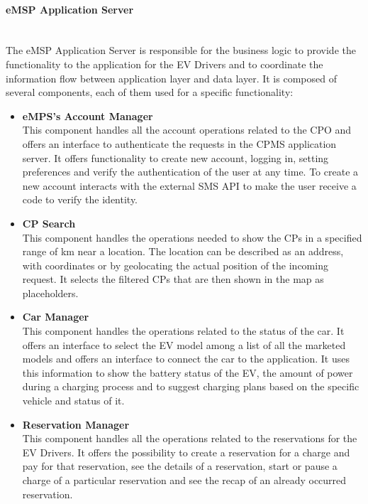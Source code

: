 \paragraph*{eMSP Application Server} \hfill \\
The eMSP Application Server is responsible for the business logic to provide the functionality to the application for the EV Drivers and to coordinate the information flow between application layer and data layer.
It is composed of several components, each of them used for a specific functionality:\\
\begin{itemize}
    \item \textbf{eMPS's Account Manager} \\ This component handles all the account operations related to the CPO and offers an interface to authenticate
          the requests in the CPMS application server.
          It offers functionality to create new account, logging in, setting preferences and verify the authentication of the user at any time.
          To create a new account interacts with the external SMS API to make the user receive a code to verify the identity.
    \item \textbf{CP Search} \\ This component handles the operations needed to show the CPs in a specified range of km near a location. The location
          can be described as an address, with coordinates or by geolocating the actual position of the incoming request. It selects the filtered CPs that are then
          shown in the map as placeholders.
    \item \textbf{Car Manager} \\ This component handles the operations related to the status of the car. It offers an interface to select the EV model among a list of
          all the marketed models and offers an interface to connect the car to the application. It uses this information to show the battery status of the EV, the
          amount of power during a charging process and to suggest charging plans based on the specific vehicle and status of it.
    \item \textbf{Reservation Manager} \\ This component handles all the operations related to the reservations for the EV Drivers. It offers the possibility to create a reservation
          for a charge and pay for that reservation, see the details of a reservation, start or pause a charge of a particular reservation and see the recap of an already occurred reservation.

\end{itemize}
